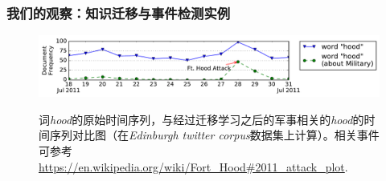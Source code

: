 \begin{frame}
\frametitle{\noindent 我们的观察：知识迁移与事件检测实例}	
\begin{figure}[h]
		\setlength{\abovecaptionskip}{0.cm}
        \setlength{\belowcaptionskip}{0.cm}
        \centering
	\caption{词\textit{hood}的原始时间序列，与经过迁移学习之后的军事相关的\textit{hood}的时间序列对比图（在\textit{Edinburgh twitter corpus}数据集上计算）。相关事件可参考\url{https://en.wikipedia.org/wiki/Fort_Hood\#2011_attack_plot}.}
        \includegraphics[width=1.0\columnwidth]{img/hood.pdf}
        \label{fig:hood}
\end{figure}

\begin{figure}[h]
	\setlength{\abovecaptionskip}{0.cm}
	\setlength{\belowcaptionskip}{0.cm}
	\centering
\end{figure}
\end{frame}


